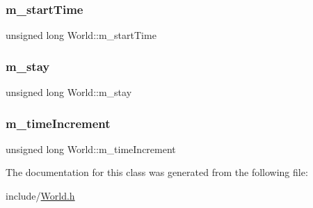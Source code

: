 \mbox{\label{class_world_a5b46814e7da7222730be62154bf10008}} 
\subsubsection{\texorpdfstring{m\+\_\+start\+Time}{m\_startTime}}
{\footnotesize\ttfamily unsigned long World\+::m\+\_\+start\+Time\hspace{0.3cm}{\ttfamily [private]}}

\mbox{\label{class_world_aec7eeecfae85a75b04b382f16baf7aa0}} 
\subsubsection{\texorpdfstring{m\+\_\+stay}{m\_stay}}
{\footnotesize\ttfamily unsigned long World\+::m\+\_\+stay\hspace{0.3cm}{\ttfamily [private]}}

\mbox{\label{class_world_a97f773548fef49eb408115c097aa995d}} 
\subsubsection{\texorpdfstring{m\+\_\+time\+Increment}{m\_timeIncrement}}
{\footnotesize\ttfamily unsigned long World\+::m\+\_\+time\+Increment\hspace{0.3cm}{\ttfamily [private]}}



The documentation for this class was generated from the following file\+:\begin{DoxyCompactItemize}
\item 
include/\hyperlink{_world_8h}{World.\+h}\end{DoxyCompactItemize}
